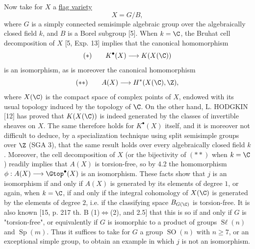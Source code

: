 %
Now take for $X$ a \uline{flag variety}
\[
 X=G/B,
\]
where $G$ is a simply connected semisimple algebraic group over the algebraically closed field $k$, and $B$ is a Borel subgroup [5]. When $k=\C$, the Bruhat cell decomposition of $X$ [5, Exp. 13] implies that the canonical homomorphism
\[
 (*)\qquad K^\bullet(X)\longrightarrow K(X(\C))
\]
is an isomorphism, as is moreover the canonical homomorphism
\[
 (**)\qquad A(X)\longrightarrow H^*(X(\C),\Z),
\]
where $X(\C)$ is the compact space of complex points of $X$, endowed with its usual topology induced by the topology of $\C$. On the other hand, L. HODGKIN [12] has proved that $K(X(\C))$ is indeed generated by the classes of invertible sheaves on $X$. The same therefore holds for $K^\bullet(X)$ itself, and it is moreover not difficult to deduce, by a specialization technique using split semisimple groups over $\Z$ (SGA 3), that the same result holds over every algebraically closed field $k$. Moreover, the cell decomposition of $X$ (or the bijectivity of $(**)$ when $k=\C$) readily implies that $A(X)$ is torsion-free, so by 4.2 the homomorphism $\phi:A(X)\longrightarrow\Gtop^\bullet(X)$ is an isomorphism. These facts show that $j$ is an isomorphism if and only if $A(X)$ is generated by its elements of degree $1$, or again, when $k=\C$, if and only if the integral cohomology of $X(\C)$ is generated by the elements of degree $2$, i.e. if the classifying space $B_{G(\C)}$ is torsion-free. It is also known [15, p. 217 th. B (1)$\Leftrightarrow$(2), and 2.5] that this is so if and only if $G$ is "torsion-free", or equivalently if $G$ is isomorphic to a product of groups $\operatorname{S\ell}(n)$ and $\operatorname{Sp}(m)$. Thus it suffices to take for $G$ a group $\operatorname{SO}(n)$ with $n\geq 7$, or an exceptional simple group, to obtain an example in which $j$ is not an isomorphism.

